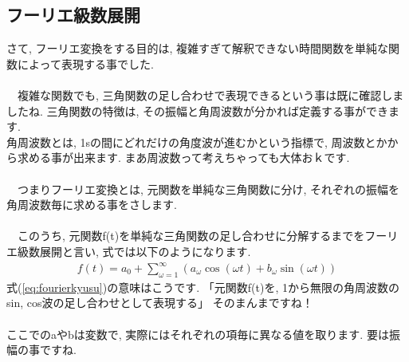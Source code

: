 \documentclass[11pt,a4paper,uplatex]{ujreport} 	%
\begin{document}
\subsection{フーリエ級数展開}
さて, フーリエ変換をする目的は, 複雑すぎて解釈できない時間関数を単純な関数によって表現する事でした.\\
\\
　複雑な関数でも, 三角関数の足し合わせで表現できるという事は既に確認しましたね. 三角関数の特徴は, その振幅と角周波数が分かれば定義する事ができます. \\
角周波数とは, 1sの間にどれだけの角度波が進むかという指標で, 周波数とかから求める事が出来ます. まあ周波数って考えちゃっても大体おｋです. \\
\\
　つまりフーリエ変換とは, 元関数を単純な三角関数に分け, それぞれの振幅を角周波数毎に求める事をさします.\\
\\
　このうち, 元関数f(t)を単純な三角関数の足し合わせに分解するまでをフーリエ級数展開と言い, 式では以下のようになります. 
\begin{eqnarray}
f(t) = a_0 + \sum_{\omega=1}^\infty {(a_\omega \cos(\omega t) + b_\omega \sin(\omega t))}
\label{eq:fourierkyusu}
\end{eqnarray}
式(\ref{eq:fourierkyusu})の意味はこうです. 「元関数f(t)を, 1から無限の角周波数のsin, cos波の足し合わせとして表現する」 そのまんまですね！\\
\\
ここでのaやbは変数で, 実際にはそれぞれの項毎に異なる値を取ります. 要は振幅の事ですね.\\
\end{document}
